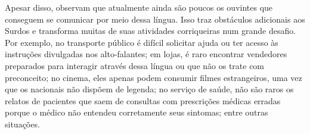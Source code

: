 







Apesar disso,  observam que atualmente ainda são poucos os ouvintes que conseguem se comunicar por meio dessa língua.
Isso traz obstáculos adicionais aos Surdos e transforma muitas de suas atividades corriqueiras num grande desafio.
Por exemplo, no transporte público é difícil solicitar ajuda ou ter acesso às instruções divulgadas nos alto-falantes;
em lojas, é raro encontrar vendedores preparados para interagir através dessa língua ou que não os trate com preconceito;
no cinema, eles apenas podem consumir filmes estrangeiros, uma vez que os nacionais não dispõem de legenda;
no serviço de saúde, não são raros os relatos de pacientes que saem de consultas com prescrições médicas erradas porque o médico não entendeu corretamente seus sintomas; entre outras situações.

